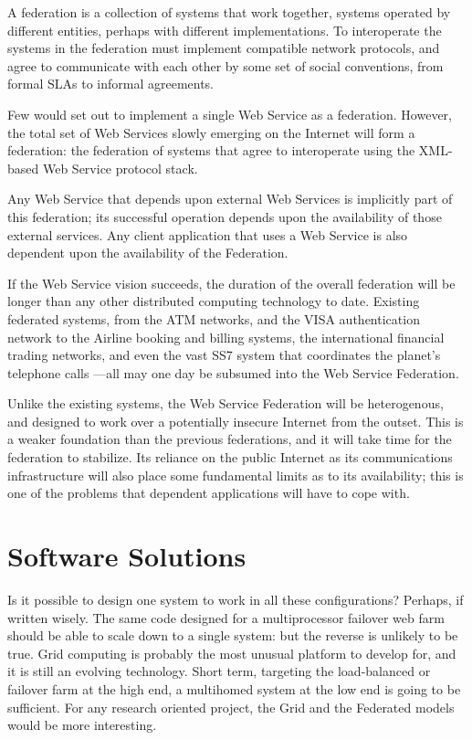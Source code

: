 \documentclass[draft]{report}
\begin{document}
A federation is a collection of systems that work together, systems
operated by different entities, perhaps with different implementations.
To interoperate the systems in the federation must implement compatible
network protocols, and agree to communicate with each other by some set
of social conventions, from formal SLAs to informal agreements.

Few would set out to implement a single Web Service as a federation.
However, the total set of Web Services slowly emerging on the Internet
will form a federation: the federation of systems that agree to
interoperate using the XML-based Web Service protocol stack.

Any Web Service that depends upon external Web Services is implicitly
part of this federation; its successful operation depends upon the
availability of those external services. Any client application that
uses a Web Service is also dependent upon the availability of the
Federation.

If the Web Service vision succeeds, the duration of the overall
federation will be longer than any other distributed computing
technology to date. Existing federated systems, from the ATM networks,
and the VISA authentication network to the Airline booking and billing
systems, the international financial trading networks, and even the vast
SS7 system that coordinates the planet's telephone calls ---all may one
day be subsumed into the Web Service Federation.

Unlike the existing systems, the Web Service Federation will be
heterogenous, and designed to work over a potentially insecure Internet
from the outset. This is a weaker foundation than the previous
federations, and it will take time for the federation to stabilize. Its
reliance on the public Internet as its communications infrastructure
will also place some fundamental limits as to its availability; this is
one of the problems that dependent applications will have to cope with.

\section{Software Solutions}

Is it possible to design one system to work in all these configurations?
Perhaps, if written wisely. The same code designed for a multiprocessor
failover web farm should be able to scale down to a single system: but
the reverse is unlikely to be true. Grid computing is probably the most
unusual platform to develop for, and it is still an evolving technology.
Short term, targeting the load-balanced or failover farm at the high
end, a multihomed system at the low end is going to be sufficient. For
any research oriented project, the Grid and the Federated models would
be more interesting.
\end{document}
